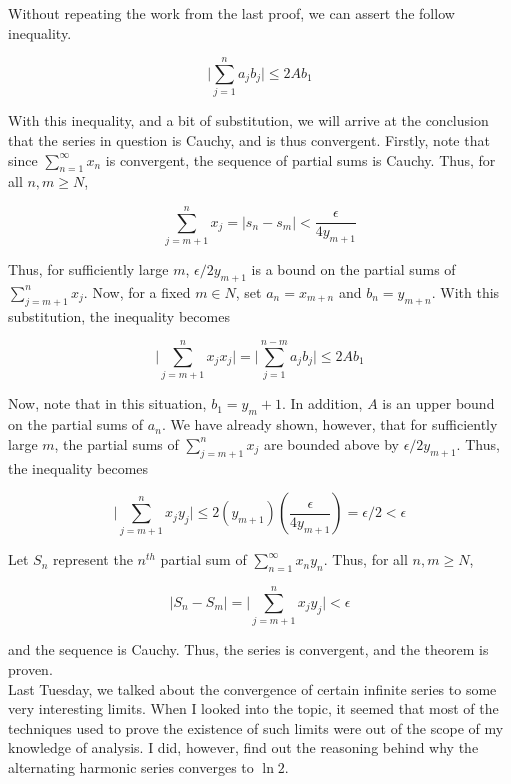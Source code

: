 \documentclass{article}
\begin{document}
Without repeating the work from the last proof, we can assert the follow inequality. 

\begin{equation}
    \Bigg|\sum_{j=1}^n a_j b_j\Bigg| \leq 2Ab_1
\end{equation}

With this inequality, and a bit of substitution, we will arrive at the conclusion that the series in question is Cauchy, and is thus convergent. Firstly, note that since $\sum_{n=1}^\infty x_n$ is convergent, the sequence of partial sums is Cauchy. Thus, for all $n, m \geq N$,  

\begin{equation}
    \sum_{j=m+1}^n x_j = |s_n - s_m | < \frac{\epsilon}{4y_{m+1}}
\end{equation}

Thus, for sufficiently large $m$, $\epsilon / 2y_{m+1}$ is a bound on the partial sums of $\sum_{j=m+1}^n x_j$. Now, for a fixed $m \in N$, set $a_n = x_{m+n}$ and $b_n = y_{m+n}$. With this substitution, the inequality becomes 

\begin{equation}
    \Bigg|\sum_{j=m+1}^n x_j x_j\Bigg| = \Bigg|\sum_{j=1}^{n-m} a_j b_j\Bigg| \leq 2Ab_1
\end{equation}

Now, note that in this situation, $b_1 = y_m+1$. In addition, $A$ is an upper bound on the partial sums of $a_n$. We have already shown, however, that for sufficiently large $m$, the partial sums of $\sum_{j=m+1}^n x_j$ are bounded above by $\epsilon / 2y_{m+1}$. Thus, the inequality becomes 

\begin{equation}
    \Bigg|\sum_{j=m+1}^n x_j y_j\Bigg| \leq 2(y_{m+1})(\frac{\epsilon}{4y_{m+1}}) = \epsilon / 2 < \epsilon
\end{equation}

Let $S_n$ represent the $n^{th}$ partial sum of $\sum_{n=1}^\infty x_n y_n$. Thus, for all $n, m \geq N$, 

\begin{equation}
    |S_n - S_m| =  \Bigg|\sum_{j=m+1}^n x_j y_j\Bigg| < \epsilon
\end{equation}

and the sequence is Cauchy. Thus, the series is convergent, and the theorem is proven. \\

Last Tuesday, we talked about the convergence of certain infinite series to some very interesting limits. When I looked into the topic, it seemed that most of the techniques used to prove the existence of such limits were out of the scope of my knowledge of analysis. I did, however, find out the reasoning behind why the alternating harmonic series converges to $\ln 2$. \\
\end{document}
